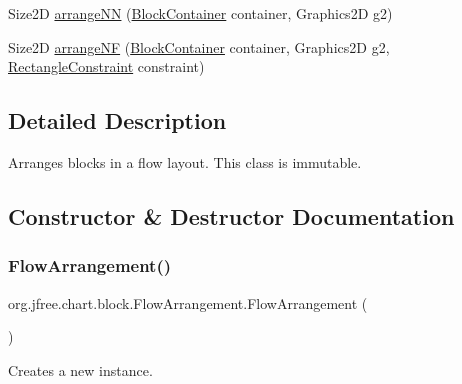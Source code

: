 \begin{DoxyCompactItemize}
\item 
Size2D \mbox{\hyperlink{classorg_1_1jfree_1_1chart_1_1block_1_1_flow_arrangement_acf281eef7b767b501284cb8173e0f3d0}{arrange\+NN}} (\mbox{\hyperlink{classorg_1_1jfree_1_1chart_1_1block_1_1_block_container}{Block\+Container}} container, Graphics2D g2)
\item 
Size2D \mbox{\hyperlink{classorg_1_1jfree_1_1chart_1_1block_1_1_flow_arrangement_a982cd288c6d9ddb8ab41bd9c3a7b71d1}{arrange\+NF}} (\mbox{\hyperlink{classorg_1_1jfree_1_1chart_1_1block_1_1_block_container}{Block\+Container}} container, Graphics2D g2, \mbox{\hyperlink{classorg_1_1jfree_1_1chart_1_1block_1_1_rectangle_constraint}{Rectangle\+Constraint}} constraint)
\end{DoxyCompactItemize}


\subsection{Detailed Description}
Arranges blocks in a flow layout. This class is immutable. 

\subsection{Constructor \& Destructor Documentation}
\mbox{\label{classorg_1_1jfree_1_1chart_1_1block_1_1_flow_arrangement_ae571ae8c8f15ad60ef0b495f82453867}} 
\subsubsection{\texorpdfstring{Flow\+Arrangement()}{FlowArrangement()}\hspace{0.1cm}{\footnotesize\ttfamily [1/2]}}
{\footnotesize\ttfamily org.\+jfree.\+chart.\+block.\+Flow\+Arrangement.\+Flow\+Arrangement (\begin{DoxyParamCaption}{ }\end{DoxyParamCaption})}

Creates a new instance. \mbox{\label{classorg_1_1jfree_1_1chart_1_1block_1_1_flow_arrangement_a8325094b7bfac966f125fa3f68e1367c}} 
